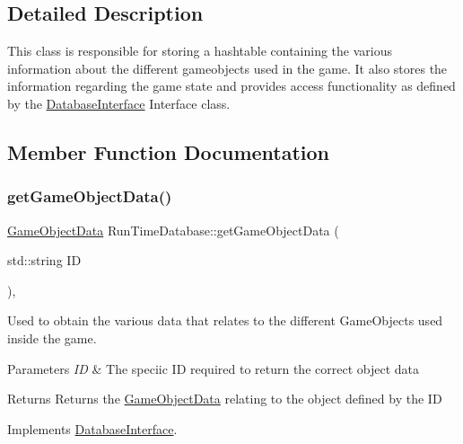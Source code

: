 \subsection{Detailed Description}
This class is responsible for storing a hashtable containing the various information about the different gameobjects used in the game. It also stores the information regarding the game state and provides access functionality as defined by the \hyperlink{class_database_interface}{Database\+Interface} Interface class. 

\subsection{Member Function Documentation}
\mbox{\label{class_run_time_database_aabe246e23f6f8ded2c3b61fcfa396f2a}} 
\subsubsection{\texorpdfstring{get\+Game\+Object\+Data()}{getGameObjectData()}}
{\footnotesize\ttfamily \hyperlink{struct_game_object_data}{Game\+Object\+Data} Run\+Time\+Database\+::get\+Game\+Object\+Data (\begin{DoxyParamCaption}\item[{std\+::string}]{ID }\end{DoxyParamCaption})\hspace{0.3cm}{\ttfamily [override]}, {\ttfamily [virtual]}}



Used to obtain the various data that relates to the different Game\+Objects used inside the game. 


\begin{DoxyParams}{Parameters}
{\em ID} & The speciic ID required to return the correct object data \\
\hline
\end{DoxyParams}
\begin{DoxyReturn}{Returns}
Returns the \hyperlink{struct_game_object_data}{Game\+Object\+Data} relating to the object defined by the ID 
\end{DoxyReturn}


Implements \hyperlink{class_database_interface_a515afa17b15a4b111ebc1a43e1d0218e}{Database\+Interface}.

